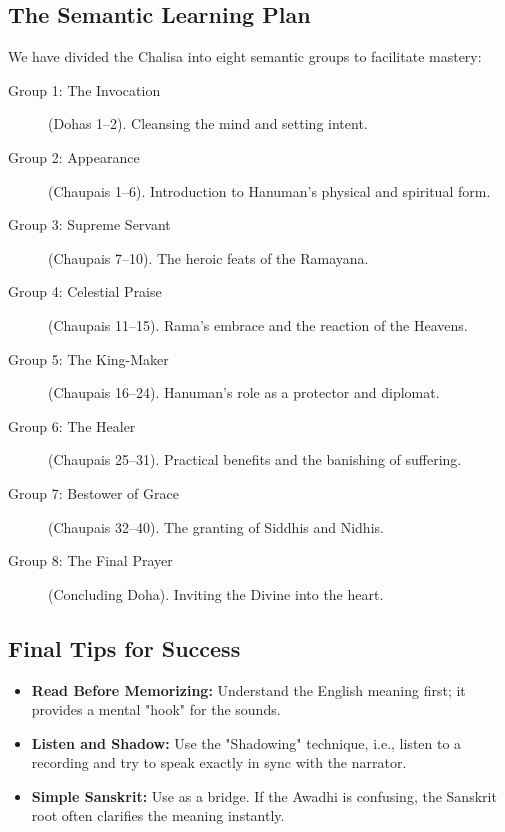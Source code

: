\subsection*{The Semantic Learning Plan}
We have divided the Chalisa into eight semantic groups to facilitate mastery:
\begin{description}
    \item[Group 1: The Invocation] (Dohas 1--2). Cleansing the mind and setting intent.
    \item[Group 2: Appearance] (Chaupais 1--6). Introduction to Hanuman's physical and spiritual form.
    \item[Group 3: Supreme Servant] (Chaupais 7--10). The heroic feats of the Ramayana.
    \item[Group 4: Celestial Praise] (Chaupais 11--15). Rama's embrace and the reaction of the Heavens.
    \item[Group 5: The King-Maker] (Chaupais 16--24). Hanuman's role as a protector and diplomat.
    \item[Group 6: The Healer] (Chaupais 25--31). Practical benefits and the banishing of suffering.
    \item[Group 7: Bestower of Grace] (Chaupais 32--40). The granting of Siddhis and Nidhis.
    \item[Group 8: The Final Prayer] (Concluding Doha). Inviting the Divine into the heart.
\end{description}

\subsection*{Final Tips for Success}
\begin{itemize}
    \item \textbf{Read Before Memorizing:} Understand the English meaning first; it provides a mental "hook" for the sounds.
    \item \textbf{Listen and Shadow:} Use the "Shadowing" technique, i.e., listen to a recording and try to speak exactly in sync with the narrator.
    \item \textbf{Simple Sanskrit:} Use  as a bridge. If the Awadhi is confusing, the Sanskrit root often clarifies the meaning instantly.
\end{itemize}

\newpage